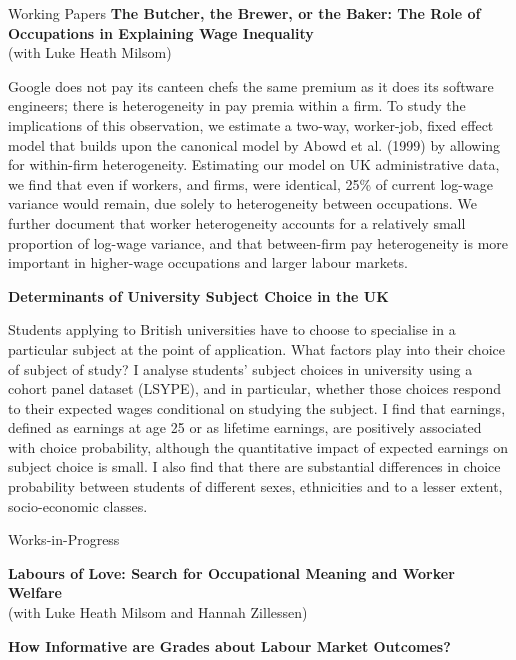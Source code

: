 \documentclass{resume} %
\begin{document}
\begin{rSection}{Working Papers}
{\bf The Butcher, the Brewer, or the Baker: The Role of Occupations in Explaining Wage Inequality} \\ (with Luke Heath Milsom)

Google does not pay its canteen chefs the same premium as it does its software engineers; there is heterogeneity in pay premia within a firm. To study the implications of this observation, we estimate a two-way, worker-job, fixed effect model that builds upon the canonical model by Abowd et al. (1999) by allowing for within-firm heterogeneity. Estimating our model on UK administrative data, we find that even if workers, and firms, were identical, 25\% of current log-wage variance would remain, due solely to heterogeneity between occupations. We further document that worker heterogeneity accounts for a relatively small proportion of log-wage variance, and that between-firm pay heterogeneity is more important in higher-wage occupations and larger labour markets.

\vspace{1mm}

{\bf Determinants of University Subject Choice in the UK}

Students applying to British universities have to choose to specialise in a particular subject at the point of application. What factors play into their choice of subject of study? I analyse students' subject choices in university using a cohort panel dataset (LSYPE), and in particular, whether those choices respond to their expected wages conditional on studying the subject. I find that earnings, defined as earnings at age 25 or as lifetime earnings, are positively associated with choice probability, although the quantitative impact of expected earnings on subject choice is small. I also find that there are substantial differences in choice probability between students of different sexes, ethnicities and to a lesser extent, socio-economic classes.

\end{rSection}

\begin{rSection}{Works-in-Progress}
 
{\bf Labours of Love: Search for Occupational Meaning and Worker Welfare} \\ (with Luke Heath Milsom and Hannah Zillessen)

{\bf How Informative are Grades about Labour Market Outcomes?}

\end{rSection}
\end{document}
